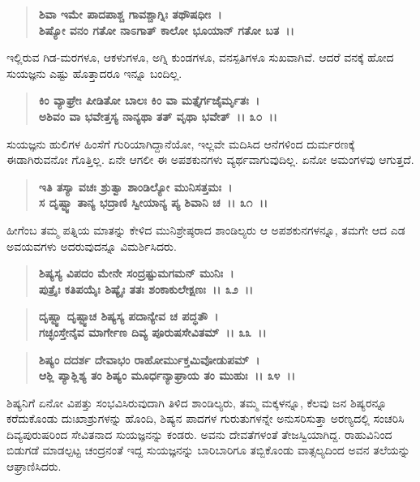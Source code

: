 \begin{verse}
\textbf{ಶಿವಾ ಇಮೇ ಪಾದಪಾಶ್ಚ ಗಾವಶ್ಚಾಗ್ನಿಃ ತಥೌಷಧೀಃ~।}\\\textbf{ಶಿಷ್ಯೋ ವನಂ ಗತೋ ನಾಽಗಾತ್ ಕಾಲೋ ಭೂಯಾನ್ ಗತೋ ಬತ~।।}
\end{verse}

ಇಲ್ಲಿರುವ ಗಿಡ-ಮರಗಳೂ, ಆಕಳುಗಳೂ, ಅಗ್ನಿ ಕುಂಡಗಳೂ, ವನಸ್ಪತಿಗಳೂ ಸುಖವಾಗಿವೆ. ಆದರೆ ವನಕ್ಕೆ ಹೋದ ಸುಯಜ್ಞನು ಎಷ್ಟು ಹೊತ್ತಾದರೂ ಇನ್ನೂ ಬಂದಿಲ್ಲ.

\begin{verse}
\textbf{ಕಿಂ ವ್ಯಾಘ್ರೇಃ ಪೀಡಿತೋ ಬಾಲಃ ಕಿಂ ವಾ ಮತ್ತೈರ್ಗಜೈರ್ಮೃತಃ~।}\\\textbf{ಅಶಿವಂ ವಾ ಭವೇತ್ತಸ್ಯ ನಾನ್ಯಥಾ ತತ್ ವೃಥಾ ಭವೇತ್~।। ೩೦~।।}
\end{verse}

ಸುಯಜ್ಞನು ಹುಲಿಗಳ ಹಿಂಸೆಗೆ ಗುರಿಯಾಗಿದ್ದಾನೆಯೋ, ಇಲ್ಲವೇ ಮದಿಸಿದ ಆನೆಗಳಿಂದ ದುರ್ಮರಣಕ್ಕೆ ಈಡಾಗಿರುವನೋ ಗೊತ್ತಿಲ್ಲ. ಏನೇ ಆಗಲೀ ಈ ಅಪಶಕುನಗಳು ವ್ಯರ್ಥವಾಗುವುದಿಲ್ಲ. ಏನೋ ಅಮಂಗಳವು ಆಗುತ್ತದೆ.

\begin{verse}
\textbf{ಇತಿ ತಸ್ಯಾ ವಚಃ ಶ್ರುತ್ವಾ ಶಾಂಡಿಲ್ಯೋ ಮುನಿಸತ್ತಮಃ~।}\\\textbf{ಸ ದೃಷ್ಟ್ವಾ ತಾನ್ಯ ಭದ್ರಾಣಿ ಸ್ವೀಯಾನ್ಯ ಪ್ಯ ಶಿವಾನಿ ಚ~।। ೩೧~।।}
\end{verse}

ಹೀಗೆಂಬ ತಮ್ಮ ಪತ್ನಿಯ ಮಾತನ್ನು ಕೇಳಿದ ಮುನಿಶ್ರೇಷ್ಠರಾದ ಶಾಂಡಿಲ್ಯರು ಆ ಅಪಶಕುನಗಳನ್ನೂ, ತಮಗೇ ಆದ ಎಡ ಅವಯವಗಳು ಅದರುವುದನ್ನೂ ವಿಮರ್ಶಿಸಿದರು.

\begin{verse}
\textbf{ಶಿಷ್ಯಸ್ಯ ವಿಪದಂ ಮೇನೇ ಸಂದ್ರಷ್ಟುಮಗಮನ್ ಮುನಿಃ~।}\\\textbf{ಪುತ್ರೈಃ ಕತಿಪಯೈಃ ಶಿಷ್ಯೈಃ ತತಃ ಶಂಕಾಕುಲೇಕ್ಷಣಃ~।। ೩೨~।।} 
\end{verse}

\begin{verse}
\textbf{ದೃಷ್ಟ್ವಾ ದೃಷ್ಟ್ವಾಚ ಶಿಷ್ಯಸ್ಯ ಪದಾನ್ಯೇವ ಚ ಪದ್ಧತೌ~।}\\\textbf{ಗಚ್ಛಂಸ್ತೇನೈವ ಮಾರ್ಗೇಣ ದಿವ್ಯ ಪೂರುಷಸೇವಿತಮ್~।। ೩೩~।।} 
\end{verse}

\begin{verse}
\textbf{ಶಿಷ್ಯಂ ದದರ್ಶ ದೇವಾಭಂ ರಾಹೋರ್ಮುಕ್ತಮಿವೋಡುಪಮ್~।}\\\textbf{ಆಶ್ಲಿ ಪ್ಯಾಶ್ಲಿಶ್ಯ ತಂ ಶಿಷ್ಯಂ ಮೂರ್ಧನ್ಯಾಘ್ರಾಯ ತಂ ಮುಹುಃ~।। ೩೪~।।}
\end{verse}

ಶಿಷ್ಯನಿಗೆ ಏನೋ ವಿಪತ್ತು ಸಂಭವಿಸಿರುವುದಾಗಿ ತಿಳಿದ ಶಾಂಡಿಲ್ಯರು, ತಮ್ಮ ಮಕ್ಕಳನ್ನೂ, ಕೆಲವು ಜನ ಶಿಷ್ಯರನ್ನೂ ಕರೆದುಕೊಂಡು ದುಃಖಾಶ್ರುಗಳನ್ನು ಹೊಂದಿ, ಶಿಷ್ಯನ ಪಾದಗಳ ಗುರುತುಗಳನ್ನೇ ಅನುಸರಿಸುತ್ತಾ ಅರಣ್ಯದಲ್ಲಿ ಸಂಚರಿಸಿ ದಿವ್ಯಪುರುಷರಿಂದ ಸೇವಿತನಾದ ಸುಯಜ್ಞನನ್ನು ಕಂಡರು. ಅವನು ದೇವತೆಗಳಂತೆ ತೇಜಸ್ವಿಯಾಗಿದ್ದ. ರಾಹುವಿನಿಂದ ಬಿಡುಗಡೆ ಮಾಡಲ್ಪಟ್ಟ ಚಂದ್ರನಂತೆ ಇದ್ದ ಸುಯಜ್ಞನನ್ನು ಬಾರಿಬಾರಿಗೂ ತಬ್ಬಿಕೊಂಡು ವಾತ್ಸಲ್ಯದಿಂದ ಅವನ ತಲೆಯನ್ನು ಆಘ್ರಾಣಿಸಿದರು.

